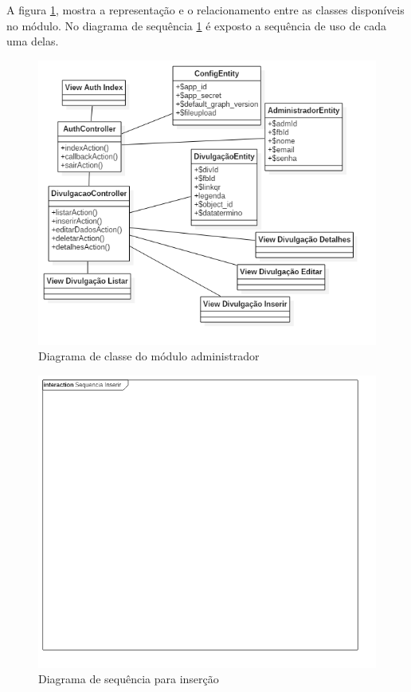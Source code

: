 A figura \ref{fig:diagramaclasseADM}, mostra a representação e o relacionamento entre as classes disponíveis no módulo. No diagrama de sequência \ref{fig:diagramaclasseADM} é exposto a sequência de uso de cada uma delas. 
\begin{figure}[H]
\centering
\includegraphics[scale=0.5]{figuras/diagramaclasseADM}
\caption{Diagrama de classe do módulo administrador}
\label{fig:diagramaclasseADM}
\end{figure}

 \begin{figure}[H]
\centering
\includegraphics[scale=0.5]{figuras/sequenciainserir}
\caption{Diagrama de sequência para inserção}
\label{fig:sequenciainserir}
\end{figure}

